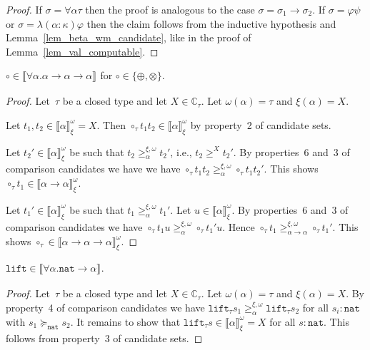 \documentclass[a4paper,UKenglish,cleveref,autoref,numberwithinsect]{lipics-v2019}
\theoremstyle{definition}
\newcommand{\arrtype}{\rightarrow}
\newcommand{\nat}{\mathtt{nat}}
\newcommand{\lift}{\mathtt{lift}}
\newcommand{\Cb}{\mathbb{C}}
\newcommand{\val}[3]{\ensuremath{\llbracket#1\rrbracket_{#2}^{#3}}}
\newcommand{\gteq}[3]{\ensuremath{\ge_{#1}^{#2,#3}}}
\begin{document}
\begin{proof}
  If $\sigma=\forall\alpha\tau$ then the proof is analogous to the
  case $\sigma=\sigma_1\arrtype\sigma_2$. If $\sigma=\varphi\psi$ or
  $\sigma=\lambda(\alpha:\kappa)\varphi$ then the claim follows from
  the inductive hypothesis and Lemma~\ref{lem_beta_wm_candidate}, like
  in the proof of Lemma~\ref{lem_val_computable}.
\end{proof}

\begin{lemma}\label{lem_wm_circ}
  $\circ \in \val{\forall \alpha . \alpha \arrtype \alpha \arrtype
    \alpha}{}{}$ for $\circ \in \{ \oplus, \otimes \}$.
\end{lemma}

\begin{proof}
  Let~$\tau$ be a closed type and let $X \in \Cb_{\tau}$. Let
  $\omega(\alpha) = \tau$ and $\xi(\alpha) = X$.

  Let $t_1,t_2 \in \val{\alpha}{\xi}{\omega} = X$. Then $\circ_{\tau}
  t_1 t_2 \in \val{\alpha}{\xi}{\omega}$ by property~2 of candidate
  sets.

  Let $t_2' \in \val{\alpha}{\xi}{\omega}$ be such that $t_2
  \gteq{\alpha}{\xi}{\omega} t_2'$, i.e., $t_2 \ge^X t_2'$. By
  properties~6 and~3 of comparison candidates we have we have
  $\circ_{\tau} t_1 t_2 \gteq{\alpha}{\xi}{\omega} \circ_{\tau} t_1
  t_2'$. This shows $\circ_{\tau} t_1 \in
  \val{\alpha\arrtype\alpha}{\xi}{\omega}$.

  Let $t_1' \in \val{\alpha}{\xi}{\omega}$ be such that $t_1
  \gteq{\alpha}{\xi}{\omega} t_1'$. Let $u \in
  \val{\alpha}{\xi}{\omega}$. By properties~6 and~3 of comparison
  candidates we have $\circ_{\tau} t_1 u \gteq{\alpha}{\xi}{\omega}
  \circ_{\tau} t_1' u$. Hence $\circ_{\tau} t_1
  \gteq{\alpha\arrtype\alpha}{\xi}{\omega} \circ_{\tau} t_1'$. This
  shows $\circ_{\tau} \in
  \val{\alpha\arrtype\alpha\arrtype\alpha}{\xi}{\omega}$.
\end{proof}

\begin{lemma}\label{lem_wm_lift}
  $\lift \in \val{\forall\alpha.\nat\arrtype\alpha}{}{}$.
\end{lemma}

\begin{proof}
  Let~$\tau$ be a closed type and let $X \in \Cb_{\tau}$. Let
  $\omega(\alpha) = \tau$ and $\xi(\alpha) = X$. By property~4 of
  comparison candidates we have $\lift_{\tau}s_1
  \gteq{\alpha}{\xi}{\omega} \lift_{\tau}s_2$ for all $s_i : \nat$
  with $s_1 \succeq_\nat s_2$. It remains to show that $\lift_{\tau}s
  \in \val{\alpha}{\xi}{\omega} = X$ for all $s : \nat$. This follows
  from property~3 of candidate sets.
\end{proof}
\end{document}
